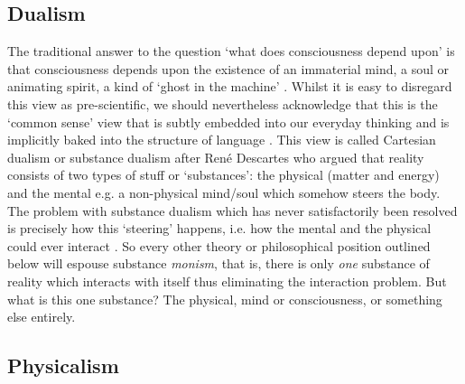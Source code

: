 \documentclass[11pt, a4paper, onecolumn, gdm]{google}
\begin{document}
\subsection{Dualism}\label{dualism}

The traditional answer to the question `what does consciousness depend upon' is that consciousness depends upon the existence of an immaterial mind, a soul or animating spirit, a kind of `ghost in the machine' \citep{ryle1949}.
Whilst it is easy to disregard this view as pre-scientific, we should nevertheless acknowledge that this is the `common sense' view that is subtly embedded into our everyday thinking and is implicitly baked into the structure of language \citep{bloom2005}.
This view is called Cartesian dualism or substance dualism after René Descartes  who argued that reality consists of two types of stuff or `substances': the physical (matter and energy) and the mental e.g. a non-physical mind/soul which somehow steers the body.
The problem with substance dualism which has never satisfactorily been resolved is precisely how this `steering' happens, i.e. how the mental and the physical could ever interact .
So every other theory or philosophical position outlined below will espouse substance \emph{monism}, that is, there is only \emph{one} substance of reality which interacts with itself thus eliminating the interaction problem.
But what is this one substance?
The physical, mind or consciousness, or something else entirely.

\subsection{Physicalism}\label{physicalism}
\end{document}
